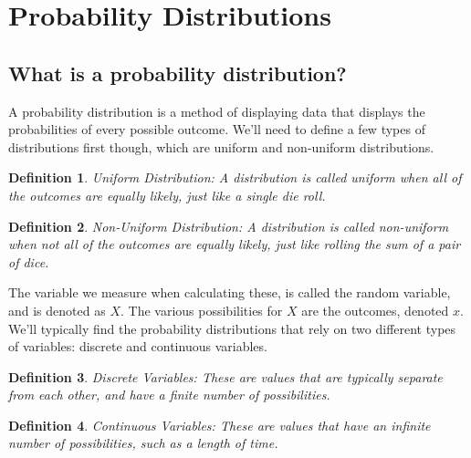 \documentclass[final,1p,12pt]{elsarticle}
\newtheorem{definition}{Definition}
\begin{document}
\section{Probability Distributions}

    \subsection{What is a probability distribution?}
    A probability distribution is a method of displaying data that displays the probabilities of every possible outcome. We'll need to define a few types of distributions first though, which are uniform and non-uniform distributions.
    \begin{definition}
        Uniform Distribution: A distribution is called uniform when all of the outcomes are equally likely, just like a single die roll.
    \end{definition}
    \begin{definition}
        Non-Uniform Distribution: A distribution is called non-uniform when not all of the outcomes are equally likely, just like rolling the sum of a pair of dice.
    \end{definition}
    The variable we measure when calculating these, is called the random variable, and is denoted as $X$. The various possibilities for $X$ are the outcomes, denoted $x$. We'll typically find the probability distributions that rely on two different types of variables: discrete and continuous variables. 
    \begin{definition}
        Discrete Variables: These are values that are typically separate from each other, and have a finite number of possibilities.
    \end{definition}
    \begin{definition}
        Continuous Variables: These are values that have an infinite number of possibilities, such as a length of time.
    \end{definition}
    
\end{document}
